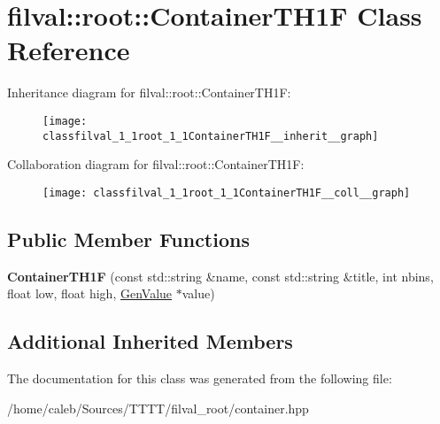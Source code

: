 \hypertarget{classfilval_1_1root_1_1ContainerTH1F}{}\section{filval\+:\+:root\+:\+:Container\+T\+H1F Class Reference}
\label{classfilval_1_1root_1_1ContainerTH1F}


Inheritance diagram for filval\+:\+:root\+:\+:Container\+T\+H1F\+:
\nopagebreak
\begin{figure}[H]
\begin{center}
\leavevmode
\texttt{[image: classfilval\_1\_1root\_1\_1ContainerTH1F\_\_inherit\_\_graph]}
\end{center}
\end{figure}


Collaboration diagram for filval\+:\+:root\+:\+:Container\+T\+H1F\+:
\nopagebreak
\begin{figure}[H]
\begin{center}
\leavevmode
\texttt{[image: classfilval\_1\_1root\_1\_1ContainerTH1F\_\_coll\_\_graph]}
\end{center}
\end{figure}
\subsection*{Public Member Functions}
\begin{DoxyCompactItemize}
\item 
\hypertarget{classfilval_1_1root_1_1ContainerTH1F_aff5e811bb5c25112e52f26254d0b7370}{}\label{classfilval_1_1root_1_1ContainerTH1F_aff5e811bb5c25112e52f26254d0b7370} 
{\bfseries Container\+T\+H1F} (const std\+::string \&name, const std\+::string \&title, int nbins, float low, float high, \hyperlink{classfilval_1_1GenValue}{Gen\+Value} $\ast$value)
\end{DoxyCompactItemize}
\subsection*{Additional Inherited Members}


The documentation for this class was generated from the following file\+:\begin{DoxyCompactItemize}
\item 
/home/caleb/\+Sources/\+T\+T\+T\+T/filval\+\_\+root/container.\+hpp\end{DoxyCompactItemize}
